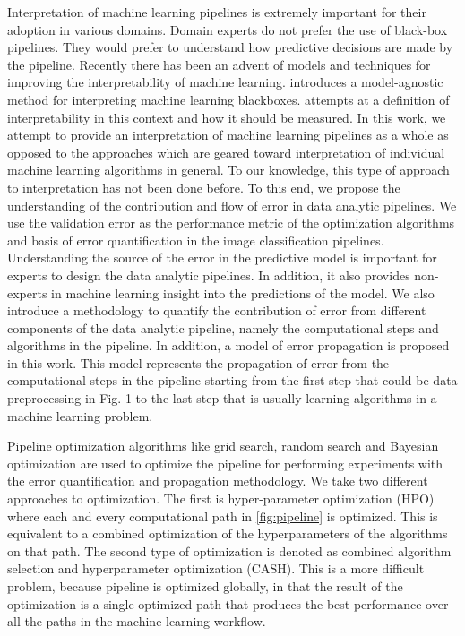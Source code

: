 Interpretation of machine learning pipelines is extremely important for their adoption in various domains. Domain experts do not prefer the use of black-box pipelines. They would prefer to understand how predictive decisions are made by the pipeline. Recently there has been an advent of models and techniques for improving the interpretability of machine learning. \cite{ribeiro2016model} introduces a model-agnostic method for interpreting machine learning blackboxes. \cite{doshi2017towards} attempts at a definition of interpretability in this context and how it should be measured. In this work, we attempt to provide an interpretation of machine learning pipelines as a whole as opposed to the approaches which are geared toward interpretation of individual machine learning algorithms in general. To our knowledge, this type of approach to interpretation has not been done before.
To this end, we propose the understanding of the contribution and flow of error in data analytic pipelines. We use the validation error as the performance metric of the optimization algorithms and basis of error quantification in the image classification pipelines. Understanding the source of the error in the predictive model is important for experts to design the data analytic pipelines. In addition, it also provides non-experts in machine learning insight into the predictions of the model. We also introduce a methodology to quantify the contribution of error from different components of the data analytic pipeline, namely the computational steps and algorithms in the pipeline. In addition, a model of error propagation is proposed in this work. This model represents the propagation of error from the computational steps in the pipeline starting from the first step that could be data preprocessing in Fig. 1 to the last step that is usually learning algorithms in a machine learning problem.  

Pipeline optimization algorithms like grid search, random search \cite{bergstra2012random} and Bayesian optimization \cite{snoek2012practical} are used to optimize the pipeline for performing experiments with the error quantification and propagation methodology. We take two different approaches to optimization. The first is hyper-parameter optimization (HPO) where each and every computational path in \ref{fig:pipeline} is optimized. This is equivalent to a combined optimization of the hyperparameters of the algorithms on that path. The second type of optimization is denoted as combined algorithm selection and hyperparameter optimization (CASH). This is a more difficult problem, because pipeline is optimized globally, in that the result of the optimization is a single optimized path that produces the best performance over all the paths in the machine learning workflow.  

